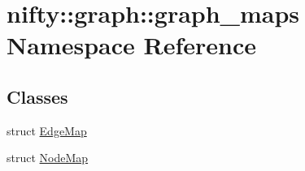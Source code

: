 \hypertarget{namespacenifty_1_1graph_1_1graph__maps}{}\section{nifty\+:\+:graph\+:\+:graph\+\_\+maps Namespace Reference}
\label{namespacenifty_1_1graph_1_1graph__maps}
\subsection*{Classes}
\begin{DoxyCompactItemize}
\item 
struct \hyperlink{structnifty_1_1graph_1_1graph__maps_1_1EdgeMap}{Edge\+Map}
\item 
struct \hyperlink{structnifty_1_1graph_1_1graph__maps_1_1NodeMap}{Node\+Map}
\end{DoxyCompactItemize}
